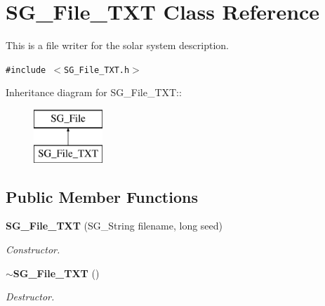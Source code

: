 \section{SG\_\-File\_\-TXT Class Reference}
\label{class_s_g___file___t_x_t}
This is a file writer for the solar system description.  


{\tt \#include $<$SG\_\-File\_\-TXT.h$>$}

Inheritance diagram for SG\_\-File\_\-TXT::\begin{figure}[H]
\begin{center}
\leavevmode
\includegraphics[height=2cm]{class_s_g___file___t_x_t}
\end{center}
\end{figure}
\subsection*{Public Member Functions}
\begin{CompactItemize}
\item 
{\bf SG\_\-File\_\-TXT} (SG\_\-String filename, long seed)\label{class_s_g___file___t_x_t_a0}

\begin{CompactList}\small\item\em Constructor. \item\end{CompactList}\item 
{\bf $\sim$SG\_\-File\_\-TXT} ()\label{class_s_g___file___t_x_t_a1}

\begin{CompactList}\small\item\em Destructor. \item\end{CompactList}\end{CompactItemize}
